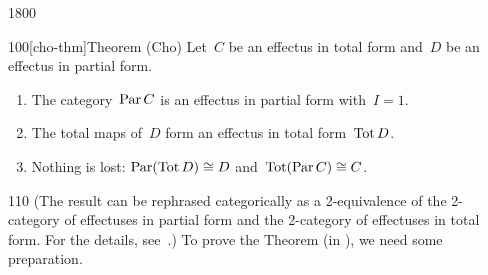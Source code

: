 \begin{parsec}{1800}
\begin{point}{100}[cho-thm]{Theorem (Cho)}
Let~$C$ be an effectus in total form
and~$D$ be an effectus in partial form.
\begin{enumerate}
\item
The category~$\operatorname{Par} C$ is an effectus in partial form
        with~$I = 1$.
\item
The total maps of~$D$ form an effectus in total form~$\operatorname{Tot} D$.
\item
    Nothing is lost:
        $\operatorname{Par} (\operatorname{Tot} D) \cong D$ and~$\operatorname{Tot} (\operatorname{Par} C )\cong C$.
\end{enumerate}
\spacingfix{}
\begin{point}{110}%
(The result can be rephrased categorically as
    a 2-equivalence of the 2-category
    of effectuses in partial form and
    the 2-category of effectuses in total form.
    For the details, see~\cite[\S5]{kentapartial}.)
To prove the Theorem
    (in ),
    we need some preparation.
\end{point}
\end{point}
\end{parsec}
